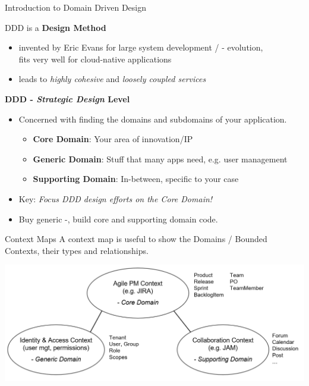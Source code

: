 \begin{frame}{Introduction to Domain Driven Design}
\begin{block}{DDD is a \textbf{Design Method} }
\vspace{-3mm}
    \small
    \begin{itemize}
     \item invented by Eric Evans for large system development / - evolution, \\
           fits very well for cloud-native applications 
   	 \item leads to \textit{highly cohesive} and \textit{loosely coupled services}
	\end {itemize}
\vspace{-3mm}
\end{block}

\vfill
\textbf{DDD - \textit{Strategic Design} Level}
\begin{itemize}
    \item Concerned with finding the domains and subdomains of your application. 
    \begin{itemize}
        \item \textbf{Core Domain}: Your area of innovation/IP
        \item \textbf{Generic Domain}: Stuff that many apps need, e.g. user management
        \item \textbf{Supporting Domain}: In-between, specific to your case
    \end{itemize}
    \item Key: \textit{Focus DDD design efforts on the Core Domain!}
    \item Buy generic -, build core and supporting domain code.
\end{itemize}
\end{frame}


\begin{frame}{Context Maps}
A context map is useful to show the Domains / Bounded Contexts, their types and relationships. 
\vfill
\centerline{
    \includegraphics[height=0.5\textheight]{../MicroServiceDesign/images/ContextMapExample}
}
\end{frame}


